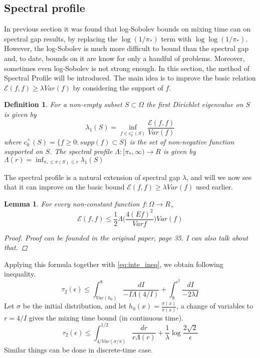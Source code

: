 \documentclass[12pt,reqno]{amsart}
\newtheorem{lem}[thm]{Lemma}
\newtheorem{definition}[thm]{Definition}
{ \theoremstyle{remark}\newtheorem*{remark}{Remark} }
\begin{document}
\subsection{Spectral profile}
In previous section it was found that log-Sobolev bounds on mixing time can on spectral gap results, by replacing the $\log(1/\pi_*)$ term with $\log\log(1/\pi_*)$. However, the log-Sobolev is much more difficult to bound than the spectral gap and, to date, bounds on it are know for only a handful of problems. Moreover, sometimes even log-Sobolev is not strong enough. In this section, the method of Spectral Profile will be introduced. The main idea is to improve the basic relation $\mathcal{E}(f,f)\geq \lambda Var(f)$ by considering the support of $f$.

\begin{definition}
  For a non-empty subset $S \subset \Omega$ the first Dirichlet eigenvalue on $S$ is given by
  \begin{equation}
    \label{eq:spectral_profile}
    \lambda_1 (S) = \inf_{f\in c_0^+(S)}\frac{\mathcal{E}(f,f)}{Var(f)}
  \end{equation}
where $c_0^+(S) = \{f\geq 0: supp (f)\subset S\}$ is the set of non-negative function supported on $S$. The spectral profile $\Lambda : [\pi_*,\infty)\rightarrow R$ is given by
$\Lambda (r) = \inf_{\pi_*\leq \pi(S) \leq r}\lambda_1 (S)$
\end{definition}

The spectral profile is a natural extension of spectral gap $\lambda$, and will we now see that it can improve on the basic bound $\mathcal{E}(f,f)\geq \lambda Var(f)$ used earlier.

\begin{lem}
  For every non-constant function $f:\Omega \rightarrow R_+$
  \begin{equation}
    \label{eq:new_bound}
    \mathcal{E}(f,f) \leq \frac{1}{2} \Lambda \bigg ( \frac{4(Ef)^2}{Var f} \bigg)Var(f)
  \end{equation}

  \begin{proof}
    Proof can be founded in the original paper, page 35. I can also talk about that.
  \end{proof}
\end{lem}

Applying this formula together with \eqref{eq:inte_ineq}, we obtain following inequality.
$$
\tau_2(\epsilon) \leq \int_{Var(h_0)}^8 \frac{dI}{-I\Lambda(4/I)} + \int_8^{\epsilon^2}\frac{dI}{-2\lambda I}
$$
Let $\sigma$ be the initial distribution, and let $h_0(x)=\frac{\sigma(x)}{\pi(x)}$, a change of variables to $r = 4/I$ gives the mixing time bound (in continuous time).
\begin{equation}
  \label{eq:prof_bound}
  \tau_2(\epsilon) \leq \int_{4/Var(\sigma/\pi)}^{1/2} \frac{dr}{r\Lambda(r)} + \frac{1}{\lambda} \log \frac{2\sqrt{2}}{\epsilon}
\end{equation}
Similar things can be done in discrete-time case.
\end{document}
